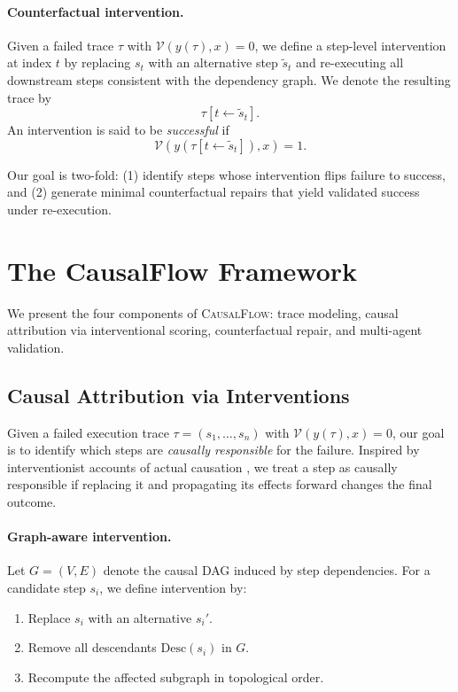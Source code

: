 \documentclass{article}
\theoremstyle{plain}
\theoremstyle{definition}
\theoremstyle{remark}
\begin{document}
\paragraph{Counterfactual intervention.}
Given a failed trace $\tau$ with $\mathcal{V}(y(\tau), x)=0$, we define a step-level intervention at index $t$ by replacing $s_t$ with an alternative step $\tilde{s}_t$ and re-executing all downstream steps consistent with the dependency graph. We denote the resulting trace by
\[
\tau[t \leftarrow \tilde{s}_t].
\]
An intervention is said to be \emph{successful} if
\[
\mathcal{V}(y(\tau[t \leftarrow \tilde{s}_t]), x) = 1.
\]

Our goal is two-fold: (1) identify steps whose intervention flips failure to success, and (2) generate minimal counterfactual repairs that yield validated success under re-execution.

\section{The CausalFlow Framework}

We present the four components of \textsc{CausalFlow}: trace modeling, causal attribution via interventional scoring, counterfactual repair, and multi-agent validation.

\subsection{Causal Attribution via Interventions}

Given a failed execution trace $\tau = (s_1, \ldots, s_n)$ with $\mathcal{V}(y(\tau), x)=0$, our goal is to identify which steps are \emph{causally responsible} for the failure. Inspired by interventionist accounts of actual causation \cite{halpern2005causes}, we treat a step as causally responsible if replacing it and propagating its effects forward changes the final outcome.

\paragraph{Graph-aware intervention.}
Let $G = (V, E)$ denote the causal DAG induced by step dependencies. For a candidate step $s_i$, we define intervention by:
\begin{enumerate}
\item Replace $s_i$ with an alternative $s_i'$.
\item Remove all descendants $\mathrm{Desc}(s_i)$ in $G$.
\item Recompute the affected subgraph in topological order.
\end{enumerate}
 
\end{document}
